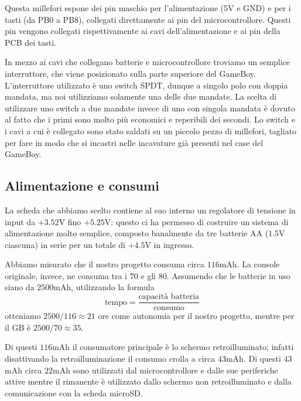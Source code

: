 \documentclass[hidelinks,12pt]{article}
\begin{document}
\begin{figure}[h]
\begin{center}
\begin{subfigure}[b]{0.4\textwidth}
\begin{center}
			\end{center}
			\caption{}
			\label{fig:pcb_side}
		\end{subfigure}
	\end{center}
	\caption{}
\end{figure}


Questa millefori espone dei pin maschio per l'alimentazione (5V e GND)
e per i tasti (da PB0 a PB8), collegati direttamente ai pin del
microcontrollore.
Questi pin vengono collegati rispettivamente ai cavi dell'alimentazione e
ai pin della PCB dei tasti.

In mezzo ai cavi che collegano batterie e microcontrollore troviamo un semplice
interruttore, che viene posizionato sulla parte superiore del GameBoy.
L'interruttore utilizzato è uno switch SPDT, dunque a singolo polo con doppia
mandata, ma noi utilizziamo solamente una delle due mandate. La scelta di
utilizzare uno switch a due mandate invece di uno con singola mandata è dovuto
al fatto che i primi sono molto più economici e reperibili dei secondi.
Lo switch e i cavi a cui è collegato sono stato saldati su un piccolo pezzo
di millefori, tagliato per fare in modo che si incastri nelle incavature già
presenti nel case del GameBoy.


\subsection{Alimentazione e consumi}
La scheda che abbiamo scelto contiene al suo interno un regolatore di tensione
in input da $+3.52$V fino $+5.25$V: questo ci ha permesso di costruire un
sistema di alimentazione molto semplice, composto banalmente da tre batterie AA
($1.5$V ciascuna) in serie per un totale di $+4.5$V in ingresso.

Abbiamo misurato che il nostro progetto consuma circa $116$mAh. La console
originale, invece, ne consuma tra i $70$ e gli $80$. Assumendo che le batterie
in uso siano da $2500$mAh, utilizzando la formula 
$$
\text{tempo} = \frac{\text{capacità batteria}}{\text{consumo}} 
$$
otteniamo $2500/116 \approx 21$ ore come autonomia per il nostro progetto,
mentre per il GB è $2500/70 \approx 35$.

Di questi $116$mAh il consumatore principale è lo schermo retroilluminato;
infatti disattivando la retroilluminazione il consumo crolla a circa $43$mAh.
Di questi $43$mAh circa $22$mAh sono utilizzati dal microcontrollore e dalle sue
periferiche attive mentre il rimanente è utilizzato dallo schermo non retroilluminato
e dalla comunicazione con la scheda microSD.
\end{document}
